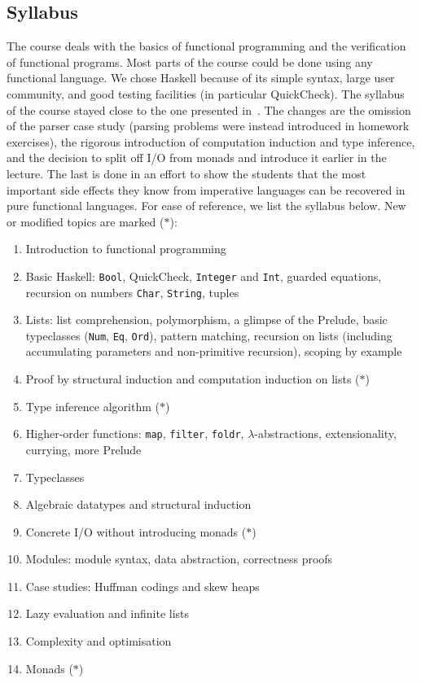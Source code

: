\subsection{Syllabus\label{sec:syllabus}}

The course deals with the basics of functional programming and the verification of functional programs.
Most parts of the course could be done using any functional language.
We chose Haskell because of its simple syntax, large user community, and good testing facilities (in particular QuickCheck).
The syllabus of the course stayed close to the one presented in~\cite{next_1100}.
The changes are the omission of the parser case study (parsing problems were instead introduced in homework exercises), the rigorous introduction of computation induction and type inference, and the decision to split off I/O from monads and introduce it earlier in the lecture.
The last is done in an effort to show the students that the most important side effects they know from imperative languages can be recovered in pure functional languages.
For ease of reference, we list the syllabus below.
New or modified topics are marked ($\ast$):

\begin{enumerate}
  \item Introduction to functional programming
  \item Basic Haskell: \texttt{Bool}, QuickCheck, \texttt{Integer} and \texttt{Int}, guarded equations, recursion on numbers \texttt{Char}, \texttt{String}, tuples
  \item Lists: list comprehension, polymorphism, a glimpse of the Prelude, basic typeclasses (\texttt{Num}, \texttt{Eq}, \texttt{Ord}), pattern matching, recursion on lists (including accumulating parameters and non-primitive recursion), scoping by example
  \item Proof by structural induction and computation induction on lists ($\ast$)
  \item Type inference algorithm ($\ast$)
  \item Higher-order functions: \texttt{map}, \texttt{filter}, \texttt{foldr}, $\lambda$-abstractions, extensionality, currying, more Prelude
  \item Typeclasses
  \item Algebraic datatypes and structural induction
  \item Concrete I/O without introducing monads ($\ast$)
  \item Modules: module syntax, data abstraction, correctness proofs
  \item Case studies: Huffman codings and skew heaps
  \item Lazy evaluation and infinite lists
  \item Complexity and optimisation
  \item Monads ($\ast$)
\end{enumerate}

